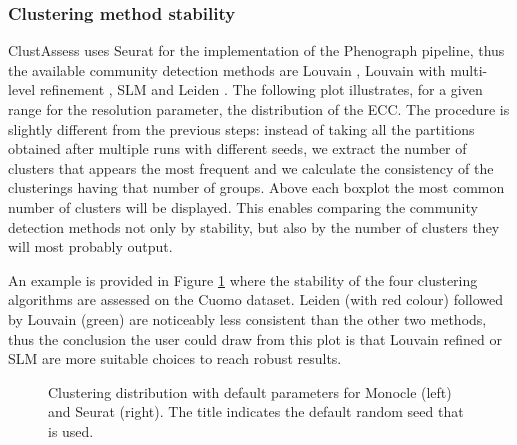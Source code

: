 \subsubsection{Clustering method stability}
ClustAssess uses Seurat for the implementation of the Phenograph pipeline, thus the available community detection methods are Louvain \cite{Blondel2008b}, Louvain with multi-level refinement \cite{Rotta2011}, SLM \cite{Waltman2013} and Leiden \cite{Traag2019a}. The following plot illustrates, for a given range for the resolution parameter, the distribution of the ECC. The procedure is slightly different from the previous steps: instead of taking all the partitions obtained after multiple runs with different seeds, we extract the number of clusters that appears the most frequent and we calculate the consistency of the clusterings having that number of groups. Above each boxplot the most common number of clusters will be displayed. This enables comparing the community detection methods not only by stability, but also by the number of clusters they will most probably output.

An example is provided in Figure \ref{fig:ca-clust-dif-boxplot} where the stability of the four clustering algorithms are assessed on the Cuomo dataset. Leiden (with red colour) followed by Louvain (green) are noticeably less consistent than the other two methods, thus the conclusion the user could draw from this plot is that Louvain refined or SLM are more suitable choices to reach robust results.

\begin{figure}[H]
    \centering
    \caption{\label{fig:ca-clust-dif-boxplot}Clustering distribution with default parameters for Monocle (left) and Seurat (right). The title indicates the default random seed that is used.}
\end{figure}

